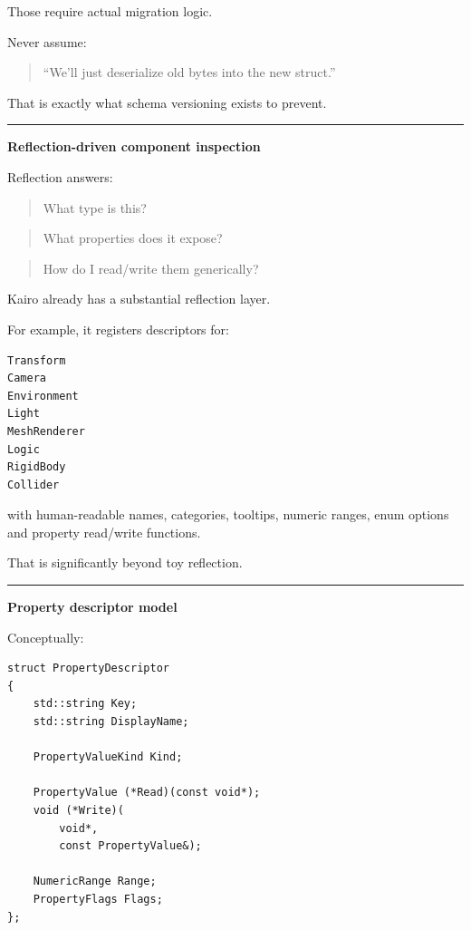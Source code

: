 Those require actual migration logic.

Never assume:

\begin{quote}
``We'll just deserialize old bytes into the new struct.''
\end{quote}

That is exactly what schema versioning exists to prevent.

\begin{center}\rule{0.5\linewidth}{0.5pt}\end{center}

\textbf{Reflection-driven component inspection}

Reflection answers:

\begin{quote}
What type is this?
\end{quote}

\begin{quote}
What properties does it expose?
\end{quote}

\begin{quote}
How do I read/write them generically?
\end{quote}

Kairo already has a substantial reflection layer.

For example, it registers descriptors for:

\begin{verbatim}
Transform
Camera
Environment
Light
MeshRenderer
Logic
RigidBody
Collider
\end{verbatim}

with human-readable names, categories, tooltips, numeric ranges, enum options and property read/write functions.

That is significantly beyond toy reflection.

\begin{center}\rule{0.5\linewidth}{0.5pt}\end{center}

\textbf{Property descriptor model}

Conceptually:

\begin{verbatim}
struct PropertyDescriptor
{
    std::string Key;
    std::string DisplayName;

    PropertyValueKind Kind;

    PropertyValue (*Read)(const void*);
    void (*Write)(
        void*,
        const PropertyValue&);

    NumericRange Range;
    PropertyFlags Flags;
};
\end{verbatim}

